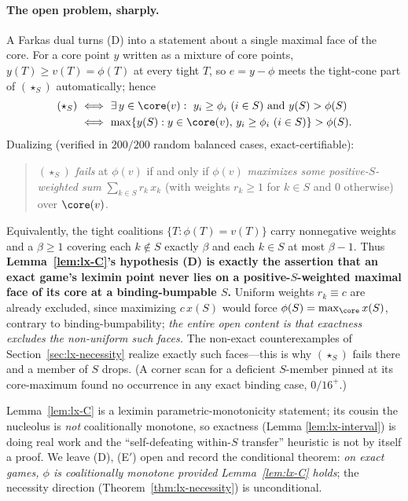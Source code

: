\paragraph{The open problem, sharply.} A Farkas dual turns (D) into a statement
about a single maximal face of the core. For a core point $y$ written as a mixture
of core points, $y(T)\ge v(T)=\phi(T)$ at every tight $T$, so $e=y-\phi$ meets the
tight-cone part of $(\star_S)$ automatically; hence
\begin{align*}
  (\star_S)\ &\Longleftrightarrow\ \exists\,y\in\core(v):\ y_i\ge\phi_i\ (i\in S)
   \ \text{and}\ y(S)>\phi(S)\\
  &\Longleftrightarrow\ \max\{y(S):y\in\core(v),\,y_i\ge\phi_i\ (i\in S)\}>\phi(S).
\end{align*}
Dualizing (verified in $200/200$ random balanced cases, exact-certifiable):
\begin{quote}
$(\star_S)$ \emph{fails} at $\phi(v)$ if and only if $\phi(v)$ \emph{maximizes some
positive-$S$-weighted sum} $\sum_{k\in S}r_k\,x_k$ (with weights $r_k\ge1$ for
$k\in S$ and $0$ otherwise) over $\core(v)$.
\end{quote}
Equivalently, the tight coalitions $\{T:\phi(T)=v(T)\}$ carry nonnegative weights and
a $\beta\ge1$ covering each $k\notin S$ exactly $\beta$ and each $k\in S$ at most
$\beta-1$. Thus \textbf{Lemma~\ref{lem:lx-C}'s hypothesis (D) is exactly the assertion
that an exact game's leximin point never lies on a positive-$S$-weighted maximal face
of its core at a binding-bumpable $S$.} Uniform weights $r_k\equiv c$ are already
excluded, since maximizing $c\,x(S)$ would force $\phi(S)=\max_{\core}x(S)$, contrary
to binding-bumpability; \emph{the entire open content is that exactness excludes the
non-uniform such faces.} The non-exact counterexamples of
Section~\ref{sec:lx-necessity} realize exactly such faces---this is why $(\star_S)$
fails there and a member of $S$ drops. (A corner scan for a deficient $S$-member
pinned at its core-maximum found no occurrence in any exact binding case, $0/16^+$.)

\begin{remark}
Lemma~\ref{lem:lx-C} is a leximin parametric-monotonicity statement; its cousin the
nucleolus is \emph{not} coalitionally monotone, so exactness (Lemma
\ref{lem:lx-interval}) is doing real work and the ``self-defeating within-$S$
transfer'' heuristic is not by itself a proof. We leave (D), (E$'$) open and record
the conditional theorem: \emph{on exact games, $\phi$ is coalitionally monotone
provided Lemma~\ref{lem:lx-C} holds}; the necessity direction
(Theorem~\ref{thm:lx-necessity}) is unconditional.
\end{remark}
